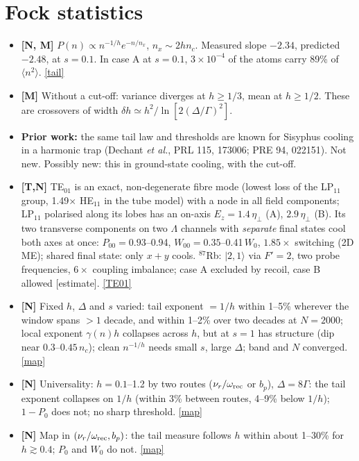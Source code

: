 \documentclass[10pt,a4paper]{article}
\newcommand{\ket}[1]{|#1\rangle}
\newcommand{\more}[2]{\href{report.pdf\##1}{[#2]}}
\begin{document}
\section*{Fock statistics}
\begin{itemize}
\item \textbf{[N, M]} $P(n)\propto n^{-1/h}e^{-n/n_x}$, $n_x\sim2hn_c$. Measured slope $-2.34$, predicted $-2.48$, at $s=0.1$. In case A at $s=0.1$, $3\times10^{-4}$ of the atoms carry 89\% of $\langle n^2\rangle$. \more{d:tail}{tail}
\item \textbf{[M]} Without a cut-off: variance diverges at $h\ge1/3$, mean at $h\ge1/2$. These are crossovers of width $\delta h\simeq h^2/\ln[2(\Delta/\Gamma)^2]$.
\item \textbf{Prior work:} the same tail law and thresholds are known for Sisyphus cooling in a harmonic trap (Dechant \emph{et al.}, PRL 115, 173006; PRE 94, 022151). Not new. Possibly new: this in ground-state cooling, with the cut-off.
\item \textbf{[T,N]} TE$_{01}$ is an exact, non-degenerate fibre mode (lowest loss of the LP$_{11}$ group, 1.49$\times$ HE$_{11}$ in the tube model) with a node in all field components; LP$_{11}$ polarised along its lobes has an on-axis $E_z=1.4\,\eta_\perp$ (A), $2.9\,\eta_\perp$ (B). Its two transverse components on two $\Lambda$ channels with \emph{separate} final states cool both axes at once: $P_{00}=0.93$--0.94, $W_{00}=0.35$--0.41\,$W_0$, $1.85\times$ switching (2D ME); shared final state: only $x+y$ cools. $^{87}$Rb: $\ket{2,1}$ via $F'=2$, two probe frequencies, $6\times$ coupling imbalance; case A excluded by recoil, case B allowed [estimate]. \more{d:te01}{TE01}
\item \textbf{[N]} Fixed $h$, $\Delta$ and $s$ varied: tail exponent $=1/h$ within 1--5\% wherever the window spans $>1$ decade, and within 1--2\% over two decades at $N=2000$; local exponent $\gamma(n)h$ collapses across $h$, but at $s=1$ has structure (dip near $0.3$--$0.45\,n_c$); clean $n^{-1/h}$ needs small $s$, large $\Delta$; band and $N$ converged. \more{d:map}{map}
\item \textbf{[N]} Universality: $h=0.1$--1.2 by two routes ($\nu_r/\omega_{\rm rec}$ or $b_p$), $\Delta=8\Gamma$: the tail exponent collapses on $1/h$ (within 3\% between routes, 4--9\% below $1/h$); $1-P_0$ does not; no sharp threshold. \more{d:map}{map}
\item \textbf{[N]} Map in $(\nu_r/\omega_{\rm rec},b_p)$: the tail measure follows $h$ within about 1--30\% for $h\gtrsim0.4$; $P_0$ and $W_0$ do not. \more{d:map}{map}
\end{itemize}
\end{document}

